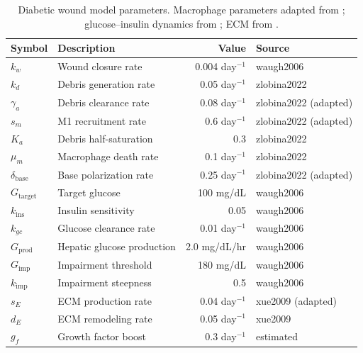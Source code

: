 \documentclass[11pt,a4paper]{article}
\begin{document}
\begin{table}[h]
\centering
\caption{Diabetic wound model parameters. Macrophage parameters adapted from \citet{zlobina2022}; glucose--insulin dynamics from \citet{waugh2006}; ECM from \citet{xue2009}.}
\begin{tabular}{@{}llrl@{}}
\toprule
Symbol & Description & Value & Source \\
\midrule
$k_w$ & Wound closure rate & 0.004 day$^{-1}$ & waugh2006 \\
$k_d$ & Debris generation rate & 0.05 day$^{-1}$ & zlobina2022 \\
$\gamma_a$ & Debris clearance rate & 0.08 day$^{-1}$ & zlobina2022 (adapted) \\
$s_m$ & M1 recruitment rate & 0.6 day$^{-1}$ & zlobina2022 (adapted) \\
$K_a$ & Debris half-saturation & 0.3 & zlobina2022 \\
$\mu_m$ & Macrophage death rate & 0.1 day$^{-1}$ & zlobina2022 \\
$\delta_{\text{base}}$ & Base polarization rate & 0.25 day$^{-1}$ & zlobina2022 (adapted) \\
$G_{\text{target}}$ & Target glucose & 100 mg/dL & waugh2006 \\
$k_{\text{ins}}$ & Insulin sensitivity & 0.05 & waugh2006 \\
$k_{gc}$ & Glucose clearance rate & 0.01 day$^{-1}$ & waugh2006 \\
$G_{\text{prod}}$ & Hepatic glucose production & 2.0 mg/dL/hr & waugh2006 \\
$G_{\text{imp}}$ & Impairment threshold & 180 mg/dL & waugh2006 \\
$k_{\text{imp}}$ & Impairment steepness & 0.5 & waugh2006 \\
$s_E$ & ECM production rate & 0.04 day$^{-1}$ & xue2009 (adapted) \\
$d_E$ & ECM remodeling rate & 0.05 day$^{-1}$ & xue2009 \\
$g_f$ & Growth factor boost & 0.3 day$^{-1}$ & estimated \\
\bottomrule
\end{tabular}
\end{table}
\end{document}
